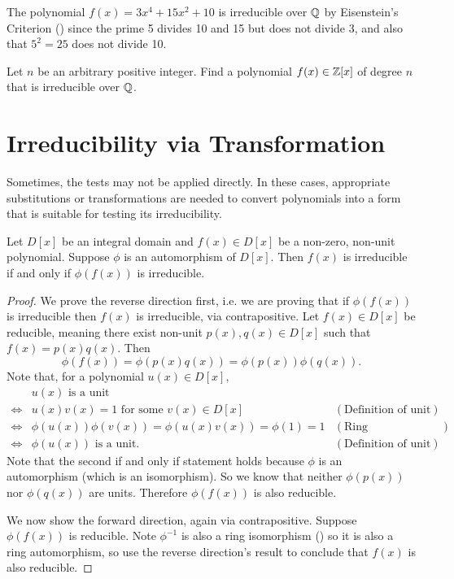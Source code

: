 \begin{example}
    The polynomial $f(x) = 3x^4 + 15x^2 + 10$ is irreducible over $\mathbb{Q}$ by Eisenstein's Criterion () since the prime 5 divides 10 and 15 but does not divide 3, and also that $5^2 = 25$ does not divide 10.
\end{example}

\begin{exercise}
    Let $n$ be an arbitrary positive integer. Find a polynomial $f(x) \in \mathbb{Z}[x]$ of degree $n$ that is irreducible over $\mathbb{Q}$.
\end{exercise}

\section{Irreducibility via Transformation}
Sometimes, the tests may not be applied directly. In these cases, appropriate substitutions or transformations are needed to convert polynomials into a form that is suitable for testing its irreducibility.

\begin{theorem}\label{thrm-transformation-rule-for-irreducibility}
    Let $D[x]$ be an integral domain and $f(x) \in D[x]$ be a non-zero, non-unit polynomial. Suppose $\phi$ is an automorphism of $D[x]$. Then $f(x)$ is irreducible if and only if $\phi(f(x))$ is irreducible.
\end{theorem}
\begin{proof}
    We prove the reverse direction first, i.e. we are proving that if $\phi(f(x))$ is irreducible then $f(x)$ is irreducible, via contrapositive. Let $f(x) \in D[x]$ be reducible, meaning there exist non-unit $p(x), q(x) \in D[x]$ such that $f(x) = p(x)q(x)$. Then
    \[
        \phi(f(x)) = \phi(p(x)q(x)) = \phi(p(x))\phi(q(x)).
    \]
    Note that, for a polynomial $u(x) \in D[x]$,
    \begin{align*}
        &u(x) \text{ is a unit}\\
        \iff&u(x)v(x) = 1 \text{ for some }v(x) \in D[x] & (\text{Definition of unit})\\
        \iff&\phi(u(x))\phi(v(x))  = \phi(u(x)v(x)) = \phi(1) = 1 & (\text{Ring homomorphism properties})\\
        \iff&\phi(u(x)) \text{ is a unit.} & (\text{Definition of unit})
    \end{align*}
    Note that the second if and only if statement holds because $\phi$ is an automorphism (which is an isomorphism). So we know that neither $\phi(p(x))$ nor $\phi(q(x))$ are units. Therefore $\phi(f(x))$ is also reducible.

    We now show the forward direction, again via contrapositive. Suppose $\phi(f(x))$ is reducible. Note $\phi^{-1}$ is also a ring isomorphism () so it is also a ring automorphism, so use the reverse direction's result to conclude that $f(x)$ is also reducible.
\end{proof}

